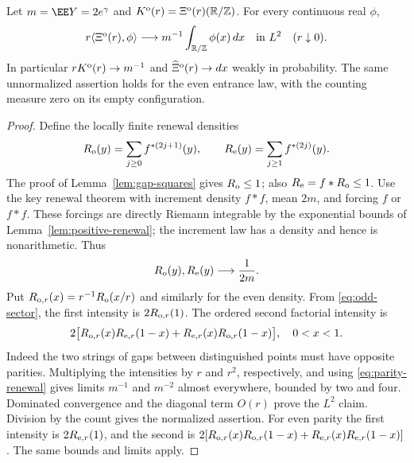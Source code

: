 \documentclass[11pt,letterpaper]{article}
\newcommand{\T}{\mathbb R/\mathbb Z}\newcommand{\Leb}{\operatorname{Leb}}
\begin{document}
\begin{theorem}
\label{thm:entrance-fluid}
Let $m=\EE Y=2e^\gamma$ and $K^{\rm o}(r)=\Xi^{\rm o}(r)(\T)$.
For every continuous real $\phi$,
\begin{equation}\label{eq:entrance-fluid}
 r\langle\Xi^{\rm o}(r),\phi\rangle
 \longrightarrow m^{-1}\int_{\T}\phi(x)\,dx\quad\hbox{in }L^2
 \quad(r\downarrow0).
\end{equation}
In particular $rK^{\rm o}(r)\to m^{-1}$ and
$\widehat\Xi^{\rm o}(r)\to dx$ weakly in probability.
The same unnormalized assertion holds for the even entrance law, with
the counting measure zero on its empty configuration.
\end{theorem}
\begin{proof}
Define the locally finite renewal densities
\[
 R_{\rm o}(y)=\sum_{j\ge0}f^{*(2j+1)}(y),\qquad
 R_{\rm e}(y)=\sum_{j\ge1}f^{*(2j)}(y).
\]
The proof of Lemma~\ref{lem:gap-squares} gives $R_{\rm o}\le1$;
also $R_{\rm e}=f*R_{\rm o}\le1$.
Use the key renewal theorem with increment density $f*f$, mean $2m$,
and forcing $f$ or $f*f$. These forcings are directly Riemann integrable
by the exponential bounds of Lemma~\ref{lem:positive-renewal}; the
increment law has a density and hence is nonarithmetic. Thus
\begin{equation}\label{eq:parity-renewal}
 R_{\rm o}(y),R_{\rm e}(y)\longrightarrow\frac1{2m}.
\end{equation}
Put $R_{{\rm o},r}(x)=r^{-1}R_{\rm o}(x/r)$ and similarly for the even
density. From \eqref{eq:odd-sector}, the first intensity is
$2R_{{\rm o},r}(1)$. The ordered second factorial intensity is
\begin{equation}\label{eq:odd-two-point}
 2\big[R_{{\rm o},r}(x)R_{{\rm e},r}(1-x)
       +R_{{\rm e},r}(x)R_{{\rm o},r}(1-x)\big],\quad 0<x<1.
\end{equation}
Indeed the two strings of gaps between distinguished points must have
opposite parities. Multiplying the intensities by $r$ and $r^2$,
respectively, and using \eqref{eq:parity-renewal} gives limits $m^{-1}$
and $m^{-2}$ almost everywhere, bounded by two and four.
Dominated convergence and the diagonal term $O(r)$ prove the $L^2$ claim.
Division by the count gives the normalized assertion.
For even parity the first intensity is $2R_{{\rm e},r}(1)$, and the
second is $2[R_{{\rm o},r}(x)R_{{\rm o},r}(1-x)+
R_{{\rm e},r}(x)R_{{\rm e},r}(1-x)]$. The same bounds and limits apply.
\end{proof}
\end{document}
